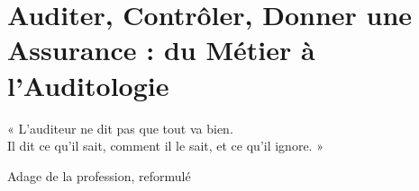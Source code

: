 
\chapter[Auditer, Contrôler, Donner une Assurance]{Auditer, Contrôler, Donner une Assurance : du Métier à l'Auditologie}
\label{chap:audit-auditologie}

\epigraph{%
    « L'auditeur ne dit pas que tout va bien.\\
    Il dit ce qu'il sait, comment il le sait, et ce qu'il ignore. »%
}{Adage de la profession, reformulé}


